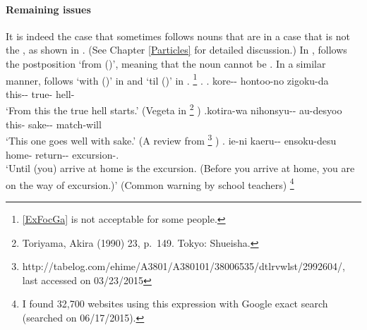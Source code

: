 \paragraph{Remaining issues}

It is indeed the case that
 sometimes follows nouns that are in a case that is not the , as shown in \Next.
(See Chapter \ref{Particles} for detailed discussion.)
In \Next[a],  follows the postposition  `from ()', meaning that the noun cannot be .
In a similar manner,
 follows  `with ()' in \Next[b] and
 `til ()' in \Next[c].%
 \footnote{\ref{ExFocGa} is not acceptable for some people.}
%
\ex.
 \ag. kore-- hontoo-no zigoku-da \\
      this-- true- hell- \\
      `From this the true hell starts.'
      \hfill{(Vegeta in %
      \footnote{
      Toriyama, Akira (1990)  23, p.~149. Tokyo: Shueisha.
      }
      )}
 \bg.\label{ExFocGa}kotira-wa nihonsyu-- au-desyoo \\
      this- sake-- match-will \\
      `This one goes well with sake.'
      \hfill{(A review from %
       \footnote{http://tabelog.com/ehime/A3801/A380101/38006535/dtlrvwlst/2992604/, last accessed on 03/23/2015}
      )}
  \bg. ie-ni kaeru-- ensoku-desu \\
       home- return-- excursion-. \\
       `Until (you) arrive at home is the excursion. (Before you arrive at home, you are on the way of excursion.)'
       \hfill{(Common warning by school teachers)}%
       \footnote{
       I found 32,700 websites using this expression with Google exact search (searched on 06/17/2015).
       }

